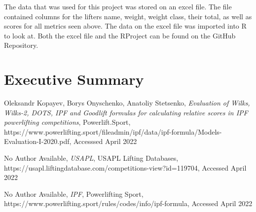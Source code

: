 \documentclass[10pt,letterpaper]{article}
\begin{document}
The data that was used for this project was stored on an excel file. The file contained columns for the lifters name, weight, weight class, their total, as well as scores for all metrics seen above. The data on the excel file was imported into R to look at. Both the excel file and the RProject can be found on the GitHub Repository. 


    \section*{Executive Summary}


    \newpage
    \begin{thebibliography}{}
        Oleksandr Kopayev, Borys Onyschenko, Anatoliy Stetsenko,
        \textit{Evaluation of Wilks, Wilks-2, DOTS, IPF and Goodlift formulas for calculating relative scores in IPF powerlifting
        competitions}, Powerlift.Sport, https://www.powerlifting.sport/fileadmin/ipf/data/ipf-formula/Models-Evaluation-I-2020.pdf, Accesssed April 2022
        
        No Author Available,
        \textit{USAPL}, USAPL Lifting Databases, https://usapl.liftingdatabase.com/competitions-view?id=119704, Accessed April 2022
        

        No Author Available,
        \textit{IPF}, Powerlifting Sport, https://www.powerlifting.sport/rules/codes/info/ipf-formula, Accessed April 2022
    \end{thebibliography}
\end{document}
